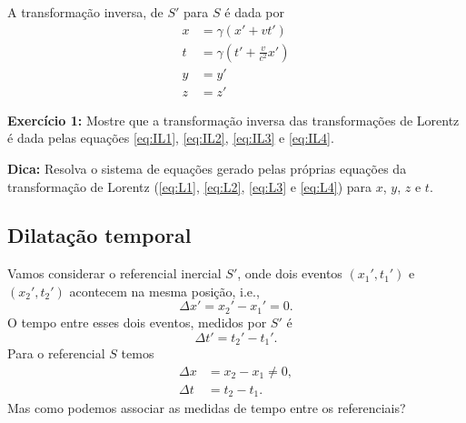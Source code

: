 \documentclass[12pt,a4paper,titlepage,brazil]{article}
\begin{document}
A transformação inversa, de $S'$ para $S$ é dada por
\begin{align}
 x & = \gamma \left( x' + v t' \right) \label{eq:IL1}\\
 t & = \gamma \left( t' + \frac{v}{c^2} x' \right) \label{eq:IL2}\\
 y & = y' \label{eq:IL3}\\
 z & = z' \label{eq:IL4}
\end{align}

\begin{tcolorbox}
  {\bf Exercício 1:} Mostre que a transformação inversa das transformações de Lorentz é dada pelas equações \ref{eq:IL1}, \ref{eq:IL2}, \ref{eq:IL3} e \ref{eq:IL4}.

  {\bf Dica:} Resolva o sistema de equações gerado pelas próprias equações da transformação de Lorentz (\ref{eq:L1}, \ref{eq:L2}, \ref{eq:L3} e \ref{eq:L4}) para $x$, $y$, $z$ e $t$. 
\end{tcolorbox}


\subsection{Dilatação temporal}

Vamos considerar o referencial inercial $S'$, onde dois eventos $(x_1', t_1')$ e $(x_2', t_2')$ acontecem na mesma posição, i.e.,
\begin{equation}
 \Delta x' = x_2' - x_1' = 0 .
\end{equation}
O tempo entre esses dois eventos, medidos por $S'$ é
\begin{equation}
 \Delta t' = t_2' - t_1' .
\end{equation}
Para o referencial $S$ temos
\begin{align}
 \Delta x & = x_2 - x_1 \neq 0 ,\\
 \Delta t & = t_2 - t_1 .
\end{align}
Mas como podemos associar as medidas de tempo entre os referenciais?
\end{document}
